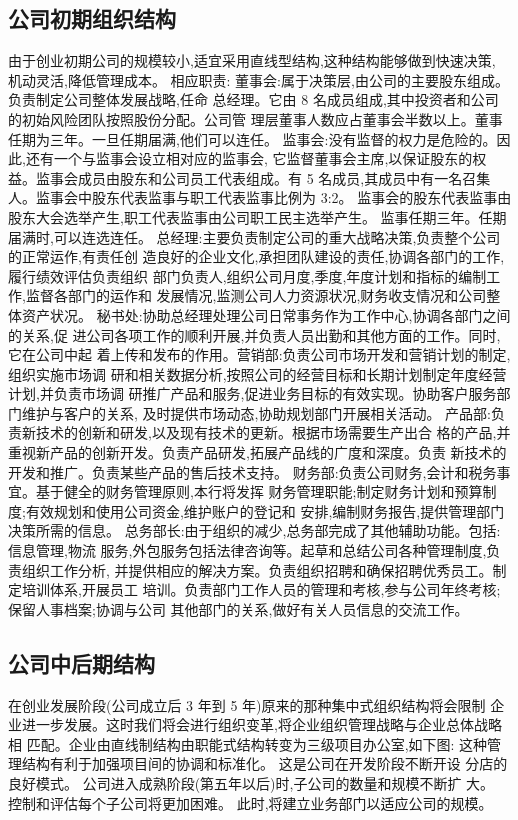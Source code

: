 \subsection{公司初期组织结构}
由于创业初期公司的规模较小,适宜采用直线型结构,这种结构能够做到快速决策,
机动灵活,降低管理成本。
相应职责:
董事会:属于决策层,由公司的主要股东组成。负责制定公司整体发展战略,任命
总经理。它由 8 名成员组成,其中投资者和公司的初始风险团队按照股份分配。公司管
理层董事人数应占董事会半数以上。董事任期为三年。一旦任期届满,他们可以连任。
监事会:没有监督的权力是危险的。因此,还有一个与监事会设立相对应的监事会,
它监督董事会主席,以保证股东的权益。监事会成员由股东和公司员工代表组成。有 5
名成员,其成员中有一名召集人。监事会中股东代表监事与职工代表监事比例为 3:2。
监事会的股东代表监事由股东大会选举产生,职工代表监事由公司职工民主选举产生。
监事任期三年。任期届满时,可以连选连任。
总经理:主要负责制定公司的重大战略决策,负责整个公司的正常运作,有责任创
造良好的企业文化,承担团队建设的责任,协调各部门的工作,履行绩效评估负责组织
部门负责人,组织公司月度,季度,年度计划和指标的编制工作,监督各部门的运作和
发展情况,监测公司人力资源状况,财务收支情况和公司整体资产状况。
秘书处:协助总经理处理公司日常事务作为工作中心,协调各部门之间的关系,促
进公司各项工作的顺利开展,并负责人员出勤和其他方面的工作。同时,它在公司中起
着上传和发布的作用。营销部:负责公司市场开发和营销计划的制定,组织实施市场调
研和相关数据分析,按照公司的经营目标和长期计划制定年度经营计划,并负责市场调
研推广产品和服务,促进业务目标的有效实现。协助客户服务部门维护与客户的关系,
及时提供市场动态,协助规划部门开展相关活动。
产品部:负责新技术的创新和研发,以及现有技术的更新。根据市场需要生产出合
格的产品,并重视新产品的创新开发。负责产品研发,拓展产品线的广度和深度。负责
新技术的开发和推广。负责某些产品的售后技术支持。
财务部:负责公司财务,会计和税务事宜。基于健全的财务管理原则,本行将发挥
财务管理职能;制定财务计划和预算制度;有效规划和使用公司资金,维护账户的登记和
安排,编制财务报告,提供管理部门决策所需的信息。
总务部长:由于组织的减少,总务部完成了其他辅助功能。包括:信息管理,物流
服务,外包服务包括法律咨询等。起草和总结公司各种管理制度,负责组织工作分析,
并提供相应的解决方案。负责组织招聘和确保招聘优秀员工。制定培训体系,开展员工
培训。负责部门工作人员的管理和考核,参与公司年终考核;保留人事档案;协调与公司
其他部门的关系,做好有关人员信息的交流工作。
\subsection{公司中后期结构}
在创业发展阶段(公司成立后 3 年到 5 年)原来的那种集中式组织结构将会限制
企业进一步发展。这时我们将会进行组织变革,将企业组织管理战略与企业总体战略相
匹配。企业由直线制结构由职能式结构转变为三级项目办公室,如下图:
这种管理结构有利于加强项目间的协调和标准化。 这是公司在开发阶段不断开设
分店的良好模式。 公司进入成熟阶段(第五年以后)时,子公司的数量和规模不断扩
大。 控制和评估每个子公司将更加困难。 此时,将建立业务部门以适应公司的规模。

